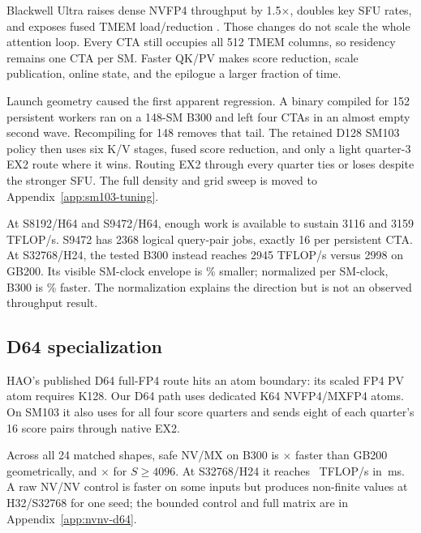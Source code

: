 Blackwell Ultra raises dense NVFP4 throughput by 1.5$\times$, doubles key SFU
rates, and exposes fused TMEM load/reduction
\cite{nvidia2025blackwellultra,nvidia2026ptx,zadouri2026flashattention4}.
Those changes do not scale the whole attention loop. Every CTA still occupies
all 512 TMEM columns, so residency remains one CTA per SM. Faster QK/PV makes
score reduction, scale publication, online state, and the epilogue a larger
fraction of time.

Launch geometry caused the first apparent regression. A binary compiled for
152 persistent workers ran on a 148-SM B300 and left four CTAs in an almost
empty second wave. Recompiling for 148 removes that tail. The retained D128
SM103 policy then uses six K/V stages, fused score reduction, and only a light
quarter-3 EX2 route where it wins. Routing EX2 through every quarter ties or
loses despite the stronger SFU. The full density and grid sweep is moved to
Appendix~\ref{app:sm103-tuning}.

At S8192/H64 and S9472/H64, enough work is available to sustain 3116 and 3159
TFLOP/s. S9472 has 2368 logical query-pair jobs, exactly 16 per persistent
CTA. At S32768/H24, the tested B300 instead reaches 2945 TFLOP/s versus 2998
on GB200. Its visible SM-clock envelope is
\BThreeSMClockEnvelopeDeficitPct\% smaller; normalized per SM-clock, B300 is
\BThreePerSMClockGainPct\% faster. The normalization explains the direction
but is not an observed throughput result.

\subsection{D64 specialization}
\label{sec:b300-d64}

HAO's published D64 full-FP4 route hits an atom boundary: its scaled FP4 PV
atom requires K128. Our D64 path uses dedicated K64 NVFP4/MXFP4 atoms. On
SM103 it also uses  for all four score quarters and sends
eight of each quarter's 16 score pairs through native EX2.

Across all 24 matched shapes, safe NV/MX on B300 is
\BThreeDsixtyfourSafeGenerationGeo$\times$ faster than GB200 geometrically,
and \BThreeDsixtyfourSafeSaturatedGenerationGeo$\times$ for $S\ge4096$. At
S32768/H24 it reaches \BThreeDsixtyfourNVMXTflops\ TFLOP/s in
\BThreeDsixtyfourNVMXTime\,ms. A raw NV/NV control is faster on some inputs
but produces non-finite values at H32/S32768 for one seed; the bounded control
and full matrix are in Appendix~\ref{app:nvnv-d64}.

